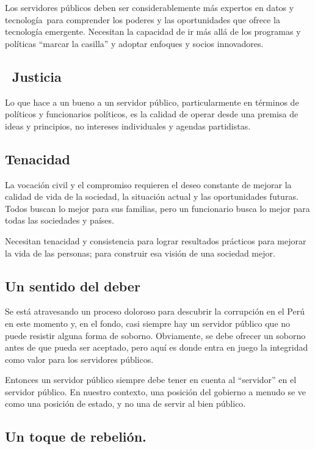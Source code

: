 \documentclass[
  a4paper,
]{article}
\begin{document}
Los servidores públicos deben ser considerablemente más expertos en
datos y tecnología~para comprender los poderes y las oportunidades que
ofrece la tecnología emergente. Necesitan la capacidad de ir más allá de
los programas y políticas ``marcar la casilla'' y adoptar enfoques y
socios innovadores.

\subsection{~Justicia}\label{justicia}

Lo que hace a un bueno a un servidor público, particularmente en
términos de políticos y funcionarios políticos, es la calidad de operar
desde una premisa de ideas y principios, no intereses individuales y
agendas partidistas.

\subsection{Tenacidad}\label{tenacidad}

La vocación civil y el compromiso requieren el deseo constante de
mejorar la calidad de vida de la sociedad, la situación actual y las
oportunidades futuras. Todos buscan lo mejor para sus familias, pero un
funcionario busca lo mejor para todas las sociedades y países.

Necesitan tenacidad y consistencia para lograr resultados prácticos para
mejorar la vida de las personas; para construir esa visión de una
sociedad mejor.

\subsection{Un sentido del deber}\label{un-sentido-del-deber}

Se está atravesando un proceso doloroso para descubrir la corrupción en
el Perú en este momento y, en el fondo, casi siempre hay un servidor
público que no puede resistir alguna forma de soborno. Obviamente, se
debe ofrecer un soborno antes de que pueda ser aceptado, pero aquí es
donde entra en juego la integridad como valor para los servidores
públicos.

Entonces un servidor público siempre debe tener en cuenta al
``servidor'' en el servidor público. En nuestro contexto, una posición
del gobierno a menudo se ve como una posición de estado, y no una de
servir al bien público.

\subsection{Un toque de rebelión.}\label{un-toque-de-rebeliuxf3n.}
\end{document}
